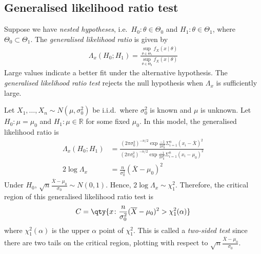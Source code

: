 \subsection{Generalised likelihood ratio test}
\begin{definition}
	Suppose we have \textit{nested hypotheses}, i.e.\ $H_0 \colon \theta \in \Theta_0$ and $H_1 \colon \theta \in \Theta_1$, where $\Theta_0 \subset \Theta_1$.
	The \textit{generalised likelihood ratio} is given by
	\begin{align*}
		\Lambda_x(H_0; H_1) = \frac{\sup_{\theta \in \Theta_1} f_X(x \mid \theta)}{\sup_{\theta \in \Theta_0} f_X(x \mid \theta)}
	\end{align*}
	Large values indicate a better fit under the alternative hypothesis.
	The \textit{generalised likelihood ratio test} rejects the null hypothesis when $\Lambda_x$ is sufficiently large.
\end{definition}
\begin{example}
	Let $X_1, \dots, X_n \sim N(\mu, \sigma_0^2)$ be i.i.d.\ where $\sigma_0^2$ is known and $\mu$ is unknown.
	Let $H_0 \colon \mu = \mu_0$ and $H_1 \colon \mu \in \mathbb R$ for some fixed $\mu_0$.
	In this model, the generalised likelihood ratio is
	\begin{align*}
		\Lambda_x(H_0; H_1) & = \frac{(2 \pi \sigma_0^2)^{-n/2} \exp{\frac{-1}{2\sigma_0^2} \Sigma_{i=1}^n (x_i - \overline X)^2}}{(2 \pi \sigma_0^2)^{-n/2} \exp{\frac{-1}{2\sigma_0^2} \Sigma_{i=1}^n (x_i - \mu_0)^2}} \\
		2\log \Lambda_x     & = \frac{n}{\sigma_0^2}(\overline X - \mu_0)^2
	\end{align*}
	Under $H_0$, $\sqrt{n} \frac{\overline X - \mu_0}{\sigma_0} \sim N(0,1)$.
	Hence, $2 \log \Lambda_x \sim \chi_1^2$.
	Therefore, the critical region of this generalised likelihood ratio test is
	\begin{align*}
		C = \qty{x \colon \frac{n}{\sigma_0^2}(\overline X - \mu_0)^2 > \chi_1^2(\alpha)}
	\end{align*}
	where $\chi_1^2(\alpha)$ is the upper $\alpha$ point of $\chi_1^2$.
	This is called a \textit{two-sided test} since there are two tails on the critical region, plotting with respect to $\sqrt{n} \frac{\overline X - \mu_0}{\sigma_0}$.
\end{example}

